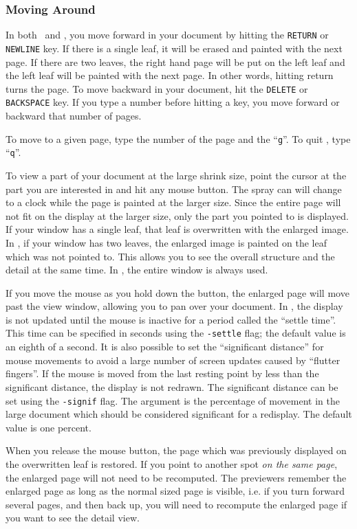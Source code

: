 \subsubsection{Moving Around}
In both \texx\ and \texsun,
you move forward in your document by hitting
the {\tt RETURN} or {\tt NEWLINE} key.
If there is a single leaf, it will be erased and painted with the next page.
If there are two leaves, the right hand page will be put on the left leaf
and the left leaf will be painted with the next page.
In other words, hitting return turns the page.
To move backward in your document, hit the {\tt DELETE} or {\tt BACKSPACE} key.
If you type a number before hitting a key, you move forward or backward
that number of pages.

To move to a given page, type the number of the page and the ``{\tt g}''.
To quit \texx, type ``{\tt q}''.

To view a part of your document at the large shrink size,
point the cursor at the part you are interested in and hit any mouse button.
The spray can will change to a clock while the page is painted
at the larger size.
Since the entire page will not fit on the display at the larger size,
only the part you pointed to is displayed.
If your window has a single leaf, that leaf is overwritten with the
enlarged image.
In \texx,
if your window has two leaves, the enlarged image is painted
on the leaf which was not pointed to.
This allows you to see the overall structure and the detail at the same
time.
In \texsun, the entire window is always used.

If you move the mouse as you hold down the button,
the enlarged page will move past the view window, allowing you
to pan over your document.
In \texsun, the display is not updated until the mouse is inactive
for a period called the ``settle time''.
This time can be specified in seconds using the {\tt -settle} flag;
the default value is an eighth of a second.
It is also possible to set the ``significant distance'' for mouse movements
to avoid a large number of screen updates caused by ``flutter fingers''.
If the mouse is moved from the last resting point by
less than the significant distance, the display is not redrawn.
The significant distance can be set using the {\tt -signif} flag.
The argument is the percentage of movement in the large document
which should be considered significant for a redisplay.
The default value is one percent.

When you release the mouse button, the page which was previously displayed
on the overwritten leaf is restored.
If you point to another spot {\em on the same page}, the enlarged page will not
need to be recomputed.
The previewers remember the enlarged page as long as the normal sized page
is visible, i.e. if you turn forward several pages, and then back up,
you will need to recompute the enlarged page if you want to see the
detail view.

